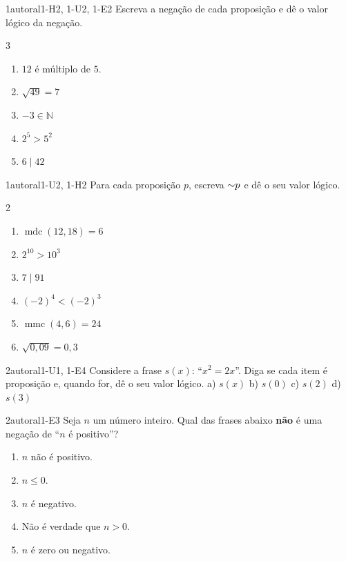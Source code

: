 \begin{questao}{1}{autoral}{1-H2, 1-U2, 1-E2}\label{u1:q4}
Escreva a negação de cada proposição e dê o valor lógico da negação.
\begin{multicols}{3}
\begin{enumerate}[label=\alph*)]
  \item $12$ é múltiplo de $5$.
  \item $\sqrt{49}=7$
  \item $-3\in\mathbb{N}$
  \item $2^5>5^2$
  \item $6\mid 42$
\end{enumerate}
\end{multicols}
\end{questao}

\begin{questao}[integradora]{1}{autoral}{1-U2, 1-H2}\label{u1:q5}
Para cada proposição $p$, escreva ${\sim} p$ e dê o seu valor lógico.
\begin{multicols}{2}
\begin{enumerate}[label=\alph*)]
  \item $\operatorname{mdc}(12,18)=6$
  \item $2^{10}>10^3$
  \item $7\mid 91$
  \item $(-2)^4<(-2)^3$
  \item $\operatorname{mmc}(4,6)=24$
  \item $\sqrt{0{,}09}=0{,}3$
\end{enumerate}
\end{multicols}
\end{questao}

\begin{questao}{2}{autoral}{1-U1, 1-E4}\label{u1:q6}
Considere a frase $s(x)$: \enquote{$x^2=2x$}. Diga se cada item é proposição e, quando for, dê o seu valor lógico.
\quad a) $s(x)$ \quad b) $s(0)$ \quad c) $s(2)$ \quad d) $s(3)$
\end{questao}

\begin{questao}{2}{autoral}{1-E3}\label{u1:q7}
Seja $n$ um número inteiro. Qual das frases abaixo \textbf{não} é uma negação de \enquote{$n$ é positivo}?
\begin{enumerate}[label=(\alph*)]
  \item $n$ não é positivo.
  \item $n\le 0$.
  \item $n$ é negativo.
  \item Não é verdade que $n>0$.
  \item $n$ é zero ou negativo.
\end{enumerate}
\end{questao}

